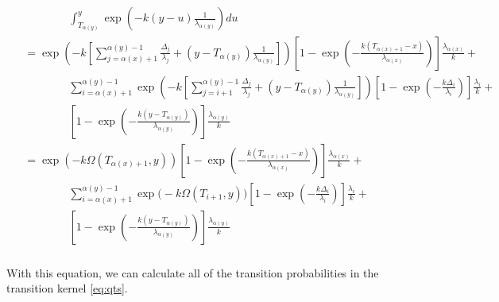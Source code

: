 \documentclass{article}
\begin{document}
\begin{align}
\begin{split}
    &\qquad \qquad \int_{T_{\alpha(y)}}^y \exp\left(-k(y-u)\frac{1}{\lambda_{\alpha(y)}}\right)du \\
    &= \exp\left(-k\left[\sum_{j=\alpha(x)+1}^{\alpha(y)-1}\frac{\Delta_j}{\lambda_j} +
        (y-T_{\alpha(y)})\frac{1}{\lambda_{\alpha(y)}}\right]\right) 
        \left[1-\exp\left(-\frac{k \left(T_{\alpha(x)+1}-x\right)}{\lambda_{\alpha(x)}}\right)\right]\frac{\lambda_{\alpha(x)}}{k}+\\
    &\qquad\qquad \sum_{i=\alpha(x)+1}^{\alpha(y)-1}
        \exp\left(-k\left[\sum_{j=i+1}^{\alpha(y)-1}\frac{\Delta_j}{\lambda_j} + (y-T_{\alpha(y)})\frac{1}{\lambda_{\alpha(y)}}
        \right]\right)
    \left[1-\exp\left(-\frac{k \Delta_i}{\lambda_i}\right)\right]\frac{\lambda_i}{k}+\\
    &\qquad \qquad 
    \left[1-\exp\left(-\frac{k \left(y-T_{\alpha(y)}\right)}{\lambda_{\alpha(y)}}\right)\right]\frac{\lambda_{\alpha(y)}}{k}\\
    &= \exp\left(-k\Omega(T_{\alpha(x)+1}, y)\right)\left[1-\exp\left(-\frac{k \left(T_{\alpha(x)+1}-x\right)}{\lambda_{\alpha(x)}}\right)\right]\frac{\lambda_{\alpha(x)}}{k}+\\
    &\qquad\qquad \sum_{i=\alpha(x)+1}^{\alpha(y)-1} \exp\big(-k\Omega(T_{i+1},y)\big)
    \left[1-\exp\left(-\frac{k \Delta_i}{\lambda_i}\right)\right]\frac{\lambda_i}{k}+\\
    &\qquad \qquad 
    \left[1-\exp\left(-\frac{k \left(y-T_{\alpha(y)}\right)}{\lambda_{\alpha(y)}}\right)\right]\frac{\lambda_{\alpha(y)}}{k}\\
    \end{split}
    \label{eq:piecewisenocoalintegral}
\end{align}

With this equation, we can calculate all of the transition probabilities in the
transition kernel \eqref{eq:qts}.
\end{document}
